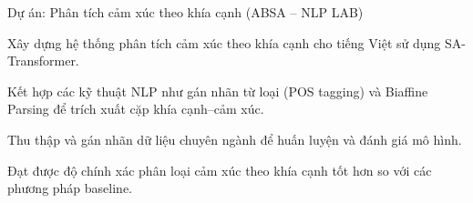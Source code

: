 \begin{cventries}
\vspace{8pt}

  \cventry
    {Dự án: Phân tích cảm xúc theo khía cạnh (ABSA -- NLP LAB)}
    {}
    {
      \begin{cvitems}
        \item {Xây dựng hệ thống phân tích cảm xúc theo khía cạnh cho tiếng Việt sử dụng SA-Transformer.}
        \item {Kết hợp các kỹ thuật NLP như gán nhãn từ loại (POS tagging) và Biaffine Parsing để trích xuất cặp khía cạnh--cảm xúc.}
        \item {Thu thập và gán nhãn dữ liệu chuyên ngành để huấn luyện và đánh giá mô hình.}
        \item {Đạt được độ chính xác phân loại cảm xúc theo khía cạnh tốt hơn so với các phương pháp baseline.}
      \end{cvitems}
    }

\end{cventries}

